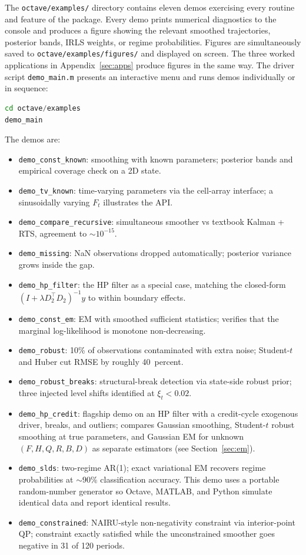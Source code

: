 \documentclass[11pt]{article}
\begin{document}
The \texttt{octave/examples/} directory contains eleven demos
exercising every routine and feature of the package.  Every demo
prints numerical diagnostics to the console and produces a figure
showing the relevant smoothed trajectories, posterior bands, IRLS
weights, or regime probabilities.  Figures are simultaneously saved to
\texttt{octave/examples/figures/} and displayed on screen.  The three
worked applications in Appendix~\ref{sec:apps} produce figures in
the same way.  The driver script \texttt{demo\_main.m} presents an
interactive menu and runs demos individually or in sequence:
\begin{lstlisting}[language=Octave]
cd octave/examples
demo_main
\end{lstlisting}
The demos are:
\begin{itemize}[leftmargin=2em,itemsep=2pt]
\item \texttt{demo\_const\_known}: smoothing with known parameters; posterior bands and empirical coverage check on a 2D state.
\item \texttt{demo\_tv\_known}: time-varying parameters via the cell-array interface; a sinusoidally varying $F_t$ illustrates the API.
\item \texttt{demo\_compare\_recursive}: simultaneous smoother vs textbook Kalman + RTS, agreement to $\sim 10^{-15}$.
\item \texttt{demo\_missing}: NaN observations dropped automatically; posterior variance grows inside the gap.
\item \texttt{demo\_hp\_filter}: the HP filter as a special case, matching the closed-form $(I+\lambda D_2^\top D_2)^{-1}y$ to within boundary effects.
\item \texttt{demo\_const\_em}: EM with smoothed sufficient statistics; verifies that the marginal log-likelihood is monotone non-decreasing.
\item \texttt{demo\_robust}: 10\% of observations contaminated with extra noise; Student-$t$ and Huber cut RMSE by roughly 40~percent.
\item \texttt{demo\_robust\_breaks}: structural-break detection via state-side robust prior; three injected level shifts identified at $\xi_t<0.02$.
\item \texttt{demo\_hp\_credit}: flagship demo on an HP filter with a credit-cycle exogenous driver, breaks, and outliers; compares Gaussian smoothing, Student-$t$ robust smoothing at true parameters, and Gaussian EM for unknown $(F,H,Q,R,B,D)$ as separate estimators (see Section~\ref{sec:em}).
\item \texttt{demo\_slds}: two-regime AR(1); exact variational EM recovers regime probabilities at $\sim 90\%$ classification accuracy.  This demo uses a portable random-number generator so Octave, MATLAB, and Python simulate identical data and report identical results.
\item \texttt{demo\_constrained}: NAIRU-style non-negativity constraint via interior-point QP; constraint exactly satisfied while the unconstrained smoother goes negative in 31 of 120 periods.
\end{itemize}
\end{document}
